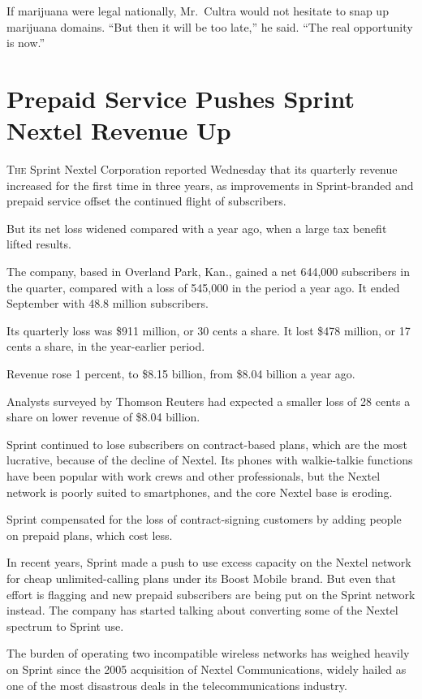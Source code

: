 ﻿\documentclass[12pt]{article}
\begin{document}
If marijuana were legal nationally, Mr.~Cultra would not hesitate to snap up marijuana domains.
``But then it will be too late,'' he said. ``The real opportunity is now.''

\section{Prepaid Service Pushes Sprint Nextel Revenue Up}

\lettrine{T}{he} Sprint Nextel Corporation reported Wednesday that its
quarterly revenue increased for the first time in three years, as improvements in Sprint-branded and
prepaid service offset the continued flight of subscribers.

But its net loss widened compared with a year ago, when a large tax benefit lifted results.

The company, based in Overland Park, Kan., gained a net 644,000 subscribers in the quarter, compared
with a loss of 545,000 in the period a year ago. It ended September with 48.8 million subscribers.

Its quarterly loss was \$911 million, or 30 cents a share. It lost \$478 million, or 17 cents a
share, in the year-earlier period.

Revenue rose 1 percent, to \$8.15 billion, from \$8.04 billion a year ago.

Analysts surveyed by Thomson Reuters had expected a smaller loss of 28 cents a share on lower
revenue of \$8.04 billion.

Sprint continued to lose subscribers on contract-based plans, which are the most lucrative, because
of the decline of Nextel. Its phones with walkie-talkie functions have been popular with work crews
and other professionals, but the Nextel network is poorly suited to smartphones, and the core Nextel
base is eroding.

Sprint compensated for the loss of contract-signing customers by adding people on prepaid plans,
which cost less.

In recent years, Sprint made a push to use excess capacity on the Nextel network for cheap
unlimited-calling plans under its Boost Mobile brand. But even that effort is flagging and new
prepaid subscribers are being put on the Sprint network instead. The company has started talking
about converting some of the Nextel spectrum to Sprint use.

The burden of operating two incompatible wireless networks has weighed heavily on Sprint since the
2005 acquisition of Nextel Communications, widely hailed as one of the most disastrous deals in the
telecommunications industry.
\end{document}
